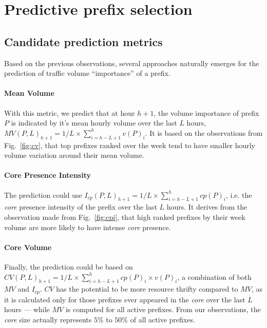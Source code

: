 \section{Predictive prefix selection}
\label{sec:sele}


\subsection{Candidate prediction metrics}

Based on the previous observations, several approaches naturally emerges for the prediction of traffic volume ``importance'' of a prefix.

\paragraph*{Mean Volume}
With this metric, we predict that at hour $h+1$, the volume importance of prefix $P$ is indicated by it's mean hourly volume over the last $L$ hours, $MV(P,L)_{h+1} = 1/L \times \sum_{i = h-L+1}^{h} v(P)_i$.
It is based on the observations from Fig.~\ref{fig:cv}, that top prefixes ranked over the week tend to have smaller hourly volume variation around their mean volume.

\paragraph*{Core Presence Intensity}
The prediction could use $I_{cp}(P,L)_{h+1} = 1/L \times \sum_{i = h-L+1}^{h} cp(P)_i$, i.e. the \textit{core} presence intensity of the prefix over the last $L$ hours. It derives from the observation made from Fig.~\ref{fig:cpi}, that high ranked prefixes by their week volume are more likely to have intense \textit{core} presence.

\paragraph*{Core Volume}
Finally, the prediction could be based on $CV(P,L)_{h+1} = 1/L \times \sum_{i = h-L+1}^{h} cp(P)_i \times v(P)_i$,  a combination of both $MV$ and $I_{cp}$.
$CV$ has the potential to be more resource thrifty compared to $MV$, as it is calculated only for those prefixes ever appeared in the \textit{core} over the last $L$ hours --- while $MV$ is computed for all active prefixes. From our observations, the \textit{core} size actually represents $5\%$ to $50\%$ of all active prefixes.

